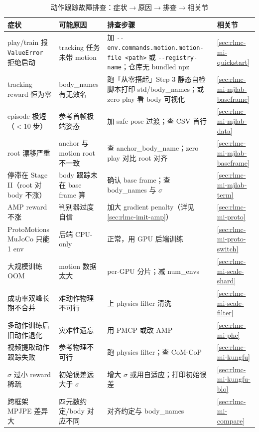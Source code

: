 \begin{table}[H]
\centering
\small
\caption{动作跟踪故障排查：症状$\to$原因$\to$排查$\to$相关节}
\label{tab:rlmc-mi-trouble}
\begin{tabular}{@{}p{3.4cm}p{3.0cm}p{4.2cm}p{2.0cm}@{}}
\toprule
症状 & 可能原因 & 排查步骤 & 相关节 \\
\midrule
play/train 报 \texttt{ValueError} 拒绝启动 & tracking 任务未带 motion & 加 \verb|--env.commands.motion.motion-file <path>| 或 \verb|--registry-name|；仓库无 bundled npz & \cref{sec:rlmc-mi-quickstart} \\
tracking reward 恒为零 & body\_names 有无效名 & 跑「从零搭起」Step 3 静态自检脚本打印 std/body\_names；或 zero play 看 body 可视化 & \cref{sec:rlmc-mi-mjlab-baseframe} \\
episode 极短（$<10$ 步） & 参考首帧极端姿态 & 加 safe pose 过渡；查 CSV 首行 & \cref{sec:rlmc-mi-mjlab-data} \\
root 漂移严重 & anchor 与 motion root 不一致 & 查 anchor\_body\_name；zero play 对比 root 对齐 & \cref{sec:rlmc-mi-mjlab-baseframe} \\
停滞在 Stage II（root 对 body 不涨） & body 跟踪未在 base frame 算 & 确认 base frame；查 body\_names 与 $\sigma$ & \cref{sec:rlmc-mi-mjlab-term} \\
AMP reward 不涨 & 判别器过度自信 & 加大 gradient penalty（详见 \cref{sec:rlmc-imit-amp}） & \cref{sec:rlmc-mi-proto} \\
ProtoMotions MuJoCo 只能 1 env & 后端 CPU-only & 正常，用 GPU 后端训练 & \cref{sec:rlmc-mi-proto-switch} \\
大规模训练 OOM & motion 数据太大 & per-GPU 分片；减 num\_envs & \cref{sec:rlmc-mi-scale-shard} \\
成功率双峰长期不合并 & 难动作物理不可行 & 上 physics filter 清洗 & \cref{sec:rlmc-mi-scale-filter} \\
多动作训练后旧动作退化 & 灾难性遗忘 & 用 PMCP 或改 AMP & \cref{sec:rlmc-mi-phc} \\
视频提取动作跟踪失败 & 参考物理不可行 & 跑 physics filter；查 CoM-CoP & \cref{sec:rlmc-mi-kungfu} \\
$\sigma$ 过小 reward 稀疏 & 初始误差远大于 $\sigma$ & 增大 $\sigma$ 或用自适应；打印初始误差 & \cref{sec:rlmc-mi-kungfu-blo} \\
跨框架 MPJPE 差异大 & 四元数约定/body 对应不同 & 对齐约定与 body\_names & \cref{sec:rlmc-mi-compare} \\
\bottomrule
\end{tabular}
\end{table}

